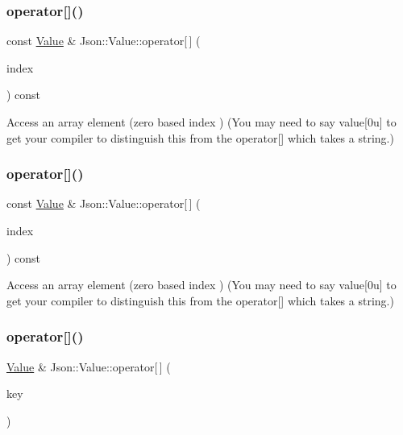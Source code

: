 \subsubsection{\texorpdfstring{operator[]()}{operator[]()}\hspace{0.1cm}{\footnotesize\ttfamily [3/9]}}
{\footnotesize\ttfamily const \hyperlink{classJson_1_1Value}{Value} \& Json\+::\+Value\+::operator\mbox{[}$\,$\mbox{]} (\begin{DoxyParamCaption}\item[{Array\+Index}]{index }\end{DoxyParamCaption}) const}

Access an array element (zero based index ) (You may need to say \textquotesingle{}value\mbox{[}0u\mbox{]}\textquotesingle{} to get your compiler to distinguish this from the operator\mbox{[}\mbox{]} which takes a string.) \mbox{\label{classJson_1_1Value_a0b42557a95621a4676b46a21ffc5e949}} 
\subsubsection{\texorpdfstring{operator[]()}{operator[]()}\hspace{0.1cm}{\footnotesize\ttfamily [4/9]}}
{\footnotesize\ttfamily const \hyperlink{classJson_1_1Value}{Value} \& Json\+::\+Value\+::operator\mbox{[}$\,$\mbox{]} (\begin{DoxyParamCaption}\item[{int}]{index }\end{DoxyParamCaption}) const}

Access an array element (zero based index ) (You may need to say \textquotesingle{}value\mbox{[}0u\mbox{]}\textquotesingle{} to get your compiler to distinguish this from the operator\mbox{[}\mbox{]} which takes a string.) \mbox{\label{classJson_1_1Value_acb912f4ec40a25ea6eb387730885f3d9}} 
\subsubsection{\texorpdfstring{operator[]()}{operator[]()}\hspace{0.1cm}{\footnotesize\ttfamily [5/9]}}
{\footnotesize\ttfamily \hyperlink{classJson_1_1Value}{Value} \& Json\+::\+Value\+::operator\mbox{[}$\,$\mbox{]} (\begin{DoxyParamCaption}\item[{const char $\ast$}]{key }\end{DoxyParamCaption})}

